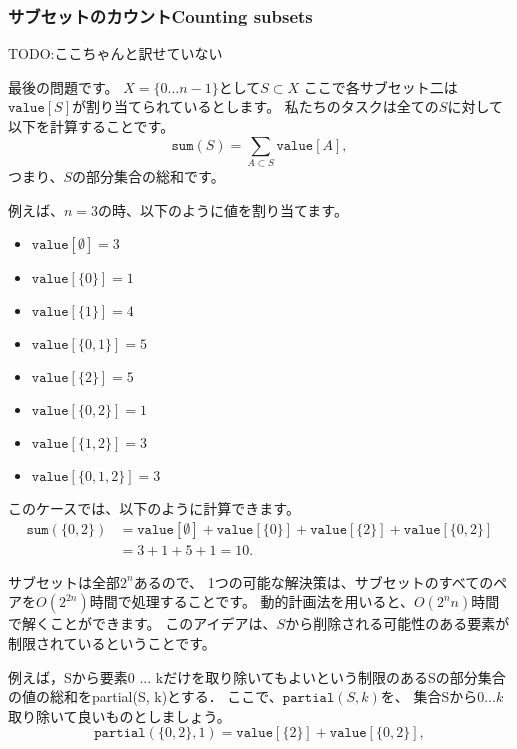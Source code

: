\subsubsection{サブセットのカウントCounting subsets}

TODO:ここちゃんと訳せていない

最後の問題です。
$X=\{0 \ldots n-1\}$として$S \subset X$
ここで各サブセット二は$\texttt{value}[S]$が割り当てられているとします。
私たちのタスクは全ての$S$に対して以下を計算することです。
\[\texttt{sum}(S) = \sum_{A \subset S} \texttt{value}[A],\]
つまり、$S$の部分集合の総和です。

例えば、$n=3$の時、以下のように値を割り当てます。
\begin{multicols}{2}
\begin{itemize}
\item $\texttt{value}[\emptyset] = 3$
\item $\texttt{value}[\{0\}] = 1$
\item $\texttt{value}[\{1\}] = 4$
\item $\texttt{value}[\{0,1\}] = 5$
\item $\texttt{value}[\{2\}] = 5$
\item $\texttt{value}[\{0,2\}] = 1$
\item $\texttt{value}[\{1,2\}] = 3$
\item $\texttt{value}[\{0,1,2\}] = 3$
\end{itemize}
\end{multicols}
このケースでは、以下のように計算できます。
\begin{equation*}
\begin{split}
\texttt{sum}(\{0,2\}) &= \texttt{value}[\emptyset]+\texttt{value}[\{0\}]+\texttt{value}[\{2\}]+\texttt{value}[\{0,2\}] \\ 
                      &= 3 + 1 + 5 + 1 = 10.
\end{split}
\end{equation*}

サブセットは全部$2^n$あるので、
1つの可能な解決策は、サブセットのすべてのペアを$O(2^{2n})$時間で処理することです。
動的計画法を用いると、$O(2^n n)$時間で解くことができます。
このアイデアは、$S$から削除される可能性のある要素が制限されているということです。

例えば，Sから要素0 ... kだけを取り除いてもよいという制限のあるSの部分集合の値の総和をpartial(S, k)とする．
ここで、$\texttt{partial}(S,k)$を、
集合Sから$0 \ldots k$取り除いて良いものとしましょう。
\[\texttt{partial}(\{0,2\},1)=\texttt{value}[\{2\}]+\texttt{value}[\{0,2\}],\]

